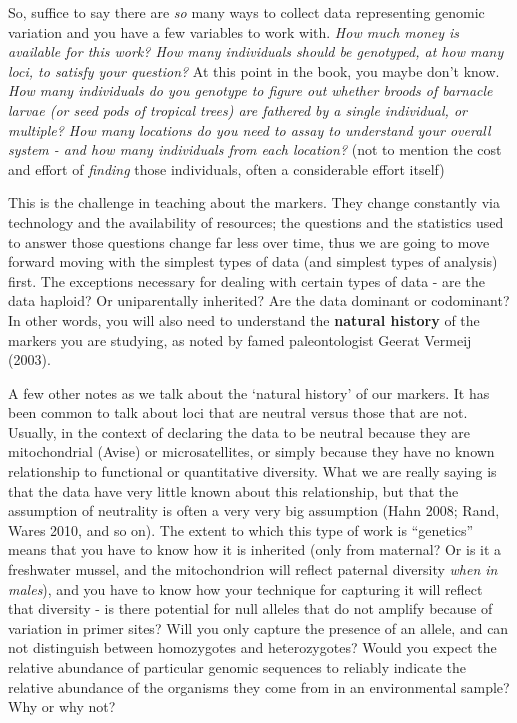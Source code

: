 \documentclass[
]{article}
\begin{document}
So, suffice to say there are \emph{so} many ways to collect data
representing genomic variation and you have a few variables to work
with. \emph{How much money is available for this work? How many
individuals should be genotyped, at how many loci, to satisfy your
question?} At this point in the book, you maybe don't know. \emph{How
many individuals do you genotype to figure out whether broods of
barnacle larvae (or seed pods of tropical trees) are fathered by a
single individual, or multiple? How many locations do you need to assay
to understand your overall system - and how many individuals from each
location?} (not to mention the cost and effort of \emph{finding} those
individuals, often a considerable effort itself)

This is the challenge in teaching about the markers. They change
constantly via technology and the availability of resources; the
questions and the statistics used to answer those questions change far
less over time, thus we are going to move forward moving with the
simplest types of data (and simplest types of analysis) first. The
exceptions necessary for dealing with certain types of data - are the
data haploid? Or uniparentally inherited? Are the data dominant or
codominant? In other words, you will also need to understand the
\textbf{natural history} of the markers you are studying, as noted by
famed paleontologist Geerat Vermeij (2003).

A few other notes as we talk about the `natural history' of our markers.
It has been common to talk about loci that are neutral versus those that
are not. Usually, in the context of declaring the data to be neutral
because they are mitochondrial (Avise) or microsatellites, or simply
because they have no known relationship to functional or quantitative
diversity. What we are really saying is that the data have very little
known about this relationship, but that the assumption of neutrality is
often a very very big assumption (Hahn 2008; Rand, Wares 2010, and so
on). The extent to which this type of work is ``genetics'' means that
you have to know how it is inherited (only from maternal? Or is it a
freshwater mussel, and the mitochondrion will reflect paternal diversity
\emph{when in males}), and you have to know how your technique for
capturing it will reflect that diversity - is there potential for null
alleles that do not amplify because of variation in primer sites? Will
you only capture the presence of an allele, and can not distinguish
between homozygotes and heterozygotes? Would you expect the relative
abundance of particular genomic sequences to reliably indicate the
relative abundance of the organisms they come from in an environmental
sample? Why or why not?
\end{document}
